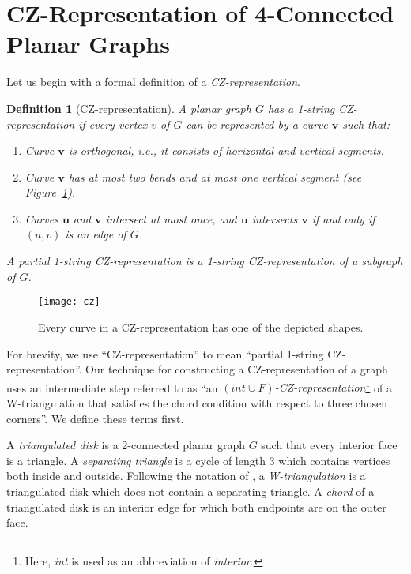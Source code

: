 \documentclass{article}
\renewcommand{\int}[1]{$(\mathit{int}\cup{#1})$}
\newcommand{\bb}[1]{\ensuremath{\mathbf{#1}}}
\newtheorem{definition}[theorem]{Definition}
\begin{document}
\section{CZ-Representation of $\mathbf{4}$-Connected Planar Graphs}
\label{sec:def}

Let us begin with a formal definition of a \emph{CZ-representation}.

\begin{definition}[CZ-representation]
\label{def:repre}
 A planar graph $G$ has a \emph{1-string CZ-representation} if every vertex $v$ of $G$ can be
 represented by a curve $\mathbf{v}$ such that: \begin{enumerate}
    \item Curve $\mathbf{v}$ is \emph{orthogonal}, i.e., it consists of horizontal and vertical segments.
    \item Curve $\mathbf{v}$ has at most two bends and at most one vertical segment (see Figure~\ref{fig:cz-curve}).
    \item Curves $\mathbf{u}$ and $\mathbf{v}$ intersect at most once, and $\bb{u}$ intersects $\bb{v}$ if and
	only if $(u,v)$ is an edge of $G$.
 \end{enumerate}
A {\em partial 1-string CZ-representation} is a 1-string CZ-representation of a subgraph of $G$.
 \end{definition}

\begin{figure}
\centering
    \texttt{[image: cz]}
    \caption{Every curve in a CZ-representation has one of the depicted shapes.}
    \label{fig:cz-curve}
\end{figure}

For brevity, we use ``CZ-representation'' to mean ``partial 1-string 
CZ-repre\-sentation''.
Our technique for constructing a CZ-representation of a graph uses an intermediate step
referred to as ``an \emph{\int{F}-CZ-representation}\footnote{Here, \emph{int} is used as an abbreviation of \emph{interior}.} of a
W-triangulation that satisfies the chord condition with respect to
three chosen corners''.
We define these terms first. 

A \emph{triangulated disk} is a 2-connected planar graph $G$ such that every 
interior face is a triangle. 
A {\em separating triangle} is a cycle of length $3$ which contains vertices
both inside and outside.   Following the notation of
\cite{cit:chalopin-string}, a \emph{W-triangulation} is a triangulated disk
which does not contain a separating triangle.
A {\em chord} of a triangulated disk is an
interior edge for which both endpoints are on the outer face.
\end{document}
